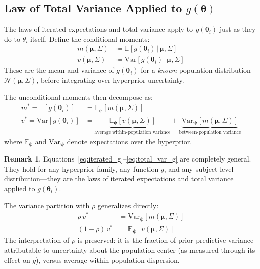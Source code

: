 \documentclass[11pt,a4paper]{article}
\theoremstyle{definition}
\newtheorem{remark}[theorem]{Remark}
\newcommand{\E}{\mathbb{E}}
\newcommand{\Var}{\mathrm{Var}}
\newcommand{\Normal}{\mathcal{N}}
\newcommand{\given}{\,|\,}
\newcommand{\bpsi}{\boldsymbol{\psi}}
\newcommand{\btheta}{\boldsymbol{\theta}}
\newcommand{\bmu}{\boldsymbol{\mu}}
\begin{document}
\subsection{Law of Total Variance Applied to \texorpdfstring{$g(\btheta)$}{g(theta)}}

The laws of iterated expectations and total variance apply to $g(\btheta_i)$
just as they do to $\theta_i$ itself. Define the conditional moments:
\begin{align}
    \label{eq:cond_mean}
    m(\bmu, \Sigma) &\coloneqq \E[g(\btheta_i) \given \bmu, \Sigma] \\
    \label{eq:cond_var}
    v(\bmu, \Sigma) &\coloneqq \Var[g(\btheta_i) \given \bmu, \Sigma]
\end{align}
These are the mean and variance of $g(\btheta_i)$ for a \emph{known} population
distribution $\Normal(\bmu, \Sigma)$, before integrating over hyperprior
uncertainty.

The unconditional moments then decompose as:
\begin{align}
    \label{eq:iterated_g}
    m^* = \E[g(\btheta_i)] &= \E_{\bpsi}[m(\bmu, \Sigma)] \\
    \label{eq:total_var_g}
    v^* = \Var[g(\btheta_i)] &= \underbrace{\E_{\bpsi}[v(\bmu, \Sigma)]}_{\text{average within-population variance}} + \underbrace{\Var_{\bpsi}[m(\bmu, \Sigma)]}_{\text{between-population variance}}
\end{align}
where $\E_{\bpsi}$ and $\Var_{\bpsi}$ denote expectations over the hyperprior.

\begin{remark}
Equations~\eqref{eq:iterated_g}--\eqref{eq:total_var_g} are completely general.
They hold for any hyperprior family, any function $g$, and any subject-level
distribution---they are the laws of iterated expectations and total variance
applied to $g(\btheta_i)$.
\end{remark}

The variance partition with $\rho$ generalizes directly:
\begin{align}
    \label{eq:rho_g}
    \rho \, v^* &= \Var_{\bpsi}[m(\bmu, \Sigma)] \\
    (1 - \rho) \, v^* &= \E_{\bpsi}[v(\bmu, \Sigma)]
\end{align}
The interpretation of $\rho$ is preserved: it is the fraction of prior
predictive variance attributable to uncertainty about the population center
(as measured through its effect on $g$), versus average within-population
dispersion.
\end{document}
